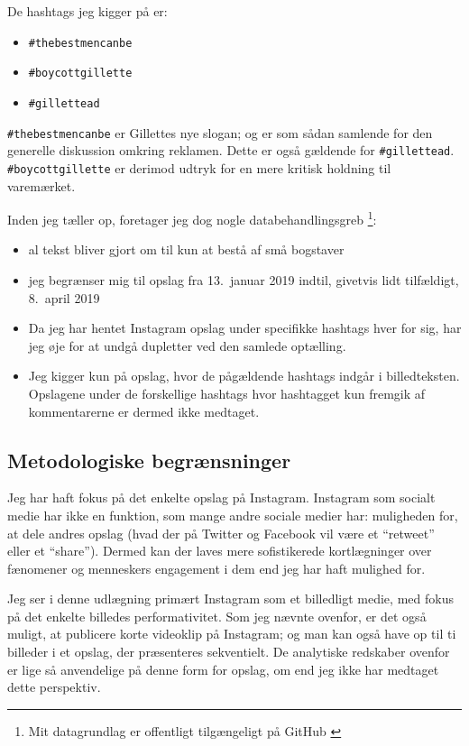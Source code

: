 De hashtags jeg kigger på er:
\begin{itemize}
    \item
        \texttt{\#thebestmencanbe}
    \item
        \texttt{\#boycottgillette}
    \item
        \texttt{\#gillettead}
\end{itemize}
\texttt{\#thebestmencanbe} er Gillettes nye slogan; og er som 
sådan samlende for den generelle diskussion omkring reklamen.  
Dette er også gældende for \texttt{\#gillettead}.  
\texttt{\#boycottgillette} er derimod udtryk for en mere kritisk 
holdning til varemærket.

Inden jeg tæller op, foretager jeg dog nogle databehandlingsgreb 
\footnote{Mit datagrundlag er offentligt tilgængeligt på GitHub 
\autocite{andersenEksamensopgaveSocialiseringOg2019}}:
\begin{itemize}
  \item
        al tekst bliver gjort om til kun at bestå af små bogstaver
    \item
        jeg begrænser mig til opslag fra 13.\ januar 2019 indtil, 
        givetvis lidt tilfældigt, 8.\ april 2019
      \item
        Da jeg har hentet Instagram opslag under specifikke 
        hashtags hver for sig, har jeg øje for at undgå dupletter 
        ved den samlede optælling.
    \item
        Jeg kigger kun på opslag, hvor de pågældende hashtags 
        indgår i billedteksten. Opslagene under de forskellige 
        hashtags hvor hashtagget kun fremgik af kommentarerne er 
        dermed ikke medtaget.
\end{itemize}

\subsection{Metodologiske begrænsninger}

Jeg har haft fokus på det enkelte opslag på Instagram. Instagram 
som socialt medie har ikke en funktion, som mange andre sociale 
medier har: muligheden for, at dele andres opslag (hvad der på 
Twitter og Facebook vil være et “retweet” eller et “share”).  
Dermed kan der laves mere sofistikerede kortlægninger over 
fænomener og menneskers engagement i dem end jeg har haft mulighed 
for.

Jeg ser i denne udlægning primært Instagram som et billedligt 
medie, med fokus på det enkelte billedes performativitet. Som jeg 
nævnte ovenfor, er det også muligt, at publicere korte videoklip 
på Instagram; og man kan også have op til ti billeder i et opslag, 
der præsenteres sekventielt. De analytiske redskaber ovenfor er 
lige så anvendelige på denne form for opslag, om end jeg ikke har 
medtaget dette perspektiv.

